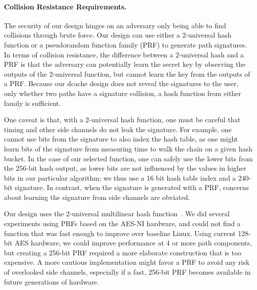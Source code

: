 \paragraph{Collision Resistance Requirements.}
The security of our design hinges on an adversary only being able to find collisions
through brute force.  
Our design can use either a 2-universal hash function or a pseudorandom function family (PRF)
to generate path signatures.
In terms of collision resistance, the difference between a 2-universal hash
and a PRF is that the adversary can potentially learn the secret key 
by observing the outputs of the 2-universal function, but cannot learn the key from 
the outputs of a PRF.
Because our dcache design does not reveal the signatures to the user,
only whether two paths have a signature collision,
a hash function from either family is sufficient.

One caveat is that, with a 2-universal hash function, 
one must be careful that timing and other side channels do not leak 
the signature.  For example, one cannot use bits from the signature
to also index the hash table, as one might learn bits of the signature from 
measuring time to walk the chain on a given hash bucket.
In the case of our selected function, one can safely use the lower bits from 
the 256-bit hash output, as lower bits are not influenced by the values in higher bits in our particular algorithm;
we thus use a 16 bit hash table index and a 240-bit signature.
In contrast, when the signature is generated with a PRF,
concerns about learning the signature from side channels are obviated.

Our design uses the 2-universal multilinear hash function~\citep{lemire2013strongly}.
We did several experiments using PRFs based on the AES-NI hardware, and could not
find a function that was fast enough to improve over baseline Linux.
Using current 128-bit AES hardware, we could improve performance at 4 or more path components,
but creating a 256-bit PRF required a more elaborate construction that is too expensive.
A more cautious implementation might favor a PRF to avoid any risk of overlooked side channels, especially
if a fast, 256-bit PRF becomes available in future generations of hardware.


